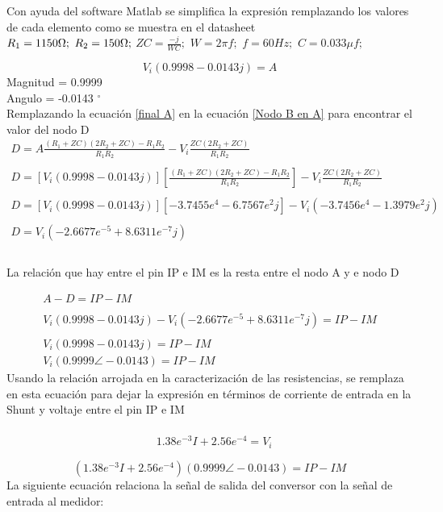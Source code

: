     Con ayuda del software Matlab se simplifica la expresión remplazando los valores de cada elemento como se muestra en el datasheet
    \\
    $ R_{1} = 1150 \ohm;$ $R_{2} = 150 \ohm;$ $ZC = \frac{-j}{WC};$
    $W = 2 \pi f;$ $f = 60 Hz;$ $C = 0.033\mu f ;$

    
    \begin{equation}\label{final A}
        V_{i}(0.9998 - 0.0143j)=A
    \end{equation}
    Magnitud = 0.9999 \\
    Angulo = -0.0143 $^{\circ}$ \\
    Remplazando la ecuación \ref{final A} en la ecuación \ref{Nodo B en A} para encontrar el valor del nodo D
    \begin{align*}
        D = A\frac{(R_{1}+ZC)(2R_{2}+ZC) - R_{1}R_{2}}{R_{1}R_{2}} - V_{i}\frac{ZC(2R_{2}+ZC)}{R_{1}R_{2}}\\\\
        D = [V_{i}(0.9998 - 0.0143j)] [\frac{(R_{1}+ZC)(2R_{2}+ZC) - R_{1}R_{2}}{R_{1}R_{2}}] - V_{i}\frac{ZC(2R_{2}+ZC)}{R_{1}R_{2}}\\\\
        D = [V_{i}(0.9998 - 0.0143j)] [-3.7455e^{4} - 6.7567e^{2}j] - V_{i}(-3.7456e^{4} - 1.3979e^{2}j)\\\\
        D = V_{i} (-2.6677e^{-5} + 8.6311e^{-7}j) \\\\
    \end{align*}
    
    La relación que hay entre el pin IP e IM es la resta entre el nodo A y e nodo D
    
    \begin{align*}
        A-D = IP-IM\\\\
        V_{i}(0.9998 - 0.0143j) - V_{i} (-2.6677e^{-5} + 8.6311e^{-7}j) = IP-IM\\\\
        V_{i}(0.9998 - 0.0143j) = IP-IM \\
        V_{i} (0.9999 \angle -0.0143) =  IP-IM
    \end{align*}
    Usando la relación arrojada en la caracterización de las resistencias, se remplaza en esta ecuación para dejar la expresión en términos de corriente de entrada en la Shunt y voltaje entre el pin IP e IM\\\\
    \begin{align*}
        &1.38e^{-3} I + 2.56e^{-4} = V_{i}\\\\
    \end{align*}
    \begin{equation}\label{Relacion corriente}
        (1.38e^{-3} I + 2.56e^{-4})(0.9999 \angle -0.0143)  = IP-IM
    \end{equation}
    La siguiente ecuación relaciona la señal de salida del conversor con la señal de entrada al medidor:\\

